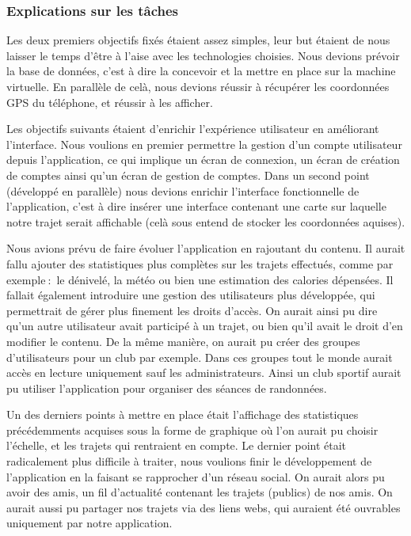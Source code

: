 \subsubsection{Explications sur les tâches}
Les deux premiers objectifs fixés étaient assez simples, leur but étaient de nous laisser le temps d'être à l'aise avec les technologies choisies.
Nous devions prévoir la base de données, c'est à dire la concevoir et la mettre en place sur la machine virtuelle. En parallèle de celà, nous devions réussir à récupérer les coordonnées GPS du téléphone, et réussir à les afficher.
\par
Les objectifs suivants étaient d'enrichir l'expérience utilisateur en améliorant l'interface. Nous voulions en premier permettre la gestion d'un compte utilisateur depuis l'application, ce qui implique un écran de connexion, un écran de création de comptes ainsi qu'un écran de gestion de comptes.
Dans un second point (développé en parallèle) nous devions enrichir l'interface fonctionnelle de l'application, c'est à dire insérer une interface contenant une carte sur laquelle notre trajet serait affichable (celà sous entend de stocker les coordonnées aquises).
\par
Nous avions prévu de faire évoluer l'application en rajoutant du contenu. Il aurait fallu ajouter des statistiques plus complètes sur les trajets effectués, comme par exemple$\ :$ le dénivelé, la météo ou bien une estimation des calories dépensées.
Il fallait également introduire une gestion des utilisateurs plus développée, qui permettrait de gérer plus finement les droits d'accès. On aurait ainsi pu dire qu'un autre utilisateur avait participé à un trajet, ou bien qu'il avait le droit d'en modifier le contenu.
De la même manière, on aurait pu créer des groupes d'utilisateurs pour un club par exemple. Dans ces groupes tout le monde aurait accès en lecture uniquement sauf les administrateurs. Ainsi un club sportif aurait pu utiliser l'application pour organiser des séances de randonnées.
\par
Un des derniers points à mettre en place était l'affichage des statistiques précédemments acquises sous la forme de graphique où l'on aurait pu choisir l'échelle, et les trajets qui rentraient en compte.
Le dernier point était radicalement plus difficile à traiter, nous voulions finir le développement de l'application en la faisant se rapprocher d'un réseau social. On aurait alors pu avoir des amis, un fil d'actualité contenant les trajets (publics) de nos amis. On aurait aussi pu partager
nos trajets via des liens webs, qui auraient été ouvrables uniquement par notre application.
